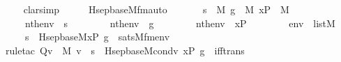 \begin{isabellebody}
\ \ \isamarkupfalse%
\ clarsimp%
\endisatagproof
{\isafoldproof}%
%
\isadelimproof
\ \isanewline
%
\endisadelimproof
\ \ \isanewline
{}\isamarkupfalse%
\ Hsep{\isacharunderscore}{\kern0pt}base{\isacharunderscore}{\kern0pt}M{\isacharunderscore}{\kern0pt}fm{\isacharunderscore}{\kern0pt}auto{\isacharcolon}{\kern0pt}\isanewline
\ \ \isanewline
\ \ \ \ {\isachardoublequoteopen}s\ {\isasymin}\ M{\isachardoublequoteclose}\ {\isachardoublequoteopen}g\ {\isasymin}\ M{\isachardoublequoteclose}\ {\isachardoublequoteopen}xP\ {\isasymin}\ M{\isachardoublequoteclose}\isanewline
\ \ \ \ {\isachardoublequoteopen}nth{\isacharparenleft}{\kern0pt}{}{\isacharcomma}{\kern0pt}env{\isacharparenright}{\kern0pt}\ {\isacharequal}{\kern0pt}\ s{\isachardoublequoteclose}\ \ \ \ \isanewline
\ \ \ \ {\isachardoublequoteopen}nth{\isacharparenleft}{\kern0pt}{}{\isacharcomma}{\kern0pt}env{\isacharparenright}{\kern0pt}\ {\isacharequal}{\kern0pt}\ g{\isachardoublequoteclose}\ \ \ \ \isanewline
\ \ \ \ {\isachardoublequoteopen}nth{\isacharparenleft}{\kern0pt}{}{\isacharcomma}{\kern0pt}env{\isacharparenright}{\kern0pt}\ {\isacharequal}{\kern0pt}\ xP{\isachardoublequoteclose}\ \ \ \ \isanewline
\ \ \ \ {\isachardoublequoteopen}env\ {\isasymin}\ list{\isacharparenleft}{\kern0pt}M{\isacharparenright}{\kern0pt}{\isachardoublequoteclose}\ \isanewline
\ \ \isanewline
\ \ \ \ {\isachardoublequoteopen}s\ {\isacharequal}{\kern0pt}\ Hsep{\isacharunderscore}{\kern0pt}base{\isacharunderscore}{\kern0pt}M{\isacharparenleft}{\kern0pt}xP{\isacharcomma}{\kern0pt}\ g{\isacharparenright}{\kern0pt}\ {\isasymlongleftrightarrow}\ sats{\isacharparenleft}{\kern0pt}M{\isacharcomma}{\kern0pt}{\isacharquery}{\kern0pt}fm{\isacharparenleft}{\kern0pt}{}{\isacharcomma}{\kern0pt}{}{\isacharcomma}{\kern0pt}{}{\isacharparenright}{\kern0pt}{\isacharcomma}{\kern0pt}env{\isacharparenright}{\kern0pt}{\isachardoublequoteclose}\isanewline
%
\isadelimproof
\isanewline
\ \ %
\endisadelimproof
%
\isatagproof
{}\isamarkupfalse%
{\isacharparenleft}{\kern0pt}rule{\isacharunderscore}{\kern0pt}tac\ Q{\isacharequal}{\kern0pt}{\isachardoublequoteopen}{\isasymforall}v\ {\isasymin}\ M{\isachardot}{\kern0pt}\ v\ {\isasymin}\ s\ {\isasymlongleftrightarrow}\ Hsep{\isacharunderscore}{\kern0pt}base{\isacharunderscore}{\kern0pt}M{\isacharunderscore}{\kern0pt}cond{\isacharparenleft}{\kern0pt}v{\isacharcomma}{\kern0pt}\ xP{\isacharcomma}{\kern0pt}\ g{\isacharparenright}{\kern0pt}{\isachardoublequoteclose}\ \ iff{\isacharunderscore}{\kern0pt}trans{\isacharparenright}{\kern0pt}\ \isanewline

\end{isabellebody}
